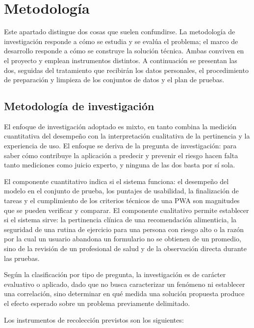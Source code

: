 \documentclass[conference]{IEEEtran}
\begin{document}
\section{Metodología}
Este apartado distingue dos cosas que suelen confundirse. La metodología de investigación responde a cómo se estudia y se evalúa el problema; el marco de desarrollo responde a cómo se construye la solución técnica. Ambas conviven en el proyecto y emplean instrumentos distintos. A continuación se presentan las dos, seguidas del tratamiento que recibirán los datos personales, el procedimiento de preparación y limpieza de los conjuntos de datos y el plan de pruebas.

\subsection{Metodología de investigación}
El enfoque de investigación adoptado es mixto, en tanto combina la medición cuantitativa del desempeño con la interpretación cualitativa de la pertinencia y la experiencia de uso. El enfoque se deriva de la pregunta de investigación: para saber cómo contribuye la aplicación a predecir y prevenir el riesgo hacen falta tanto mediciones como juicio experto, y ninguna de las dos basta por sí sola.

El componente cuantitativo indica si el sistema funciona: el desempeño del modelo en el conjunto de prueba, los puntajes de usabilidad, la finalización de tareas y el cumplimiento de los criterios técnicos de una PWA son magnitudes que se pueden verificar y comparar. El componente cualitativo permite establecer si el sistema sirve: la pertinencia clínica de una recomendación alimenticia, la seguridad de una rutina de ejercicio para una persona con riesgo alto o la razón por la cual un usuario abandona un formulario no se obtienen de un promedio, sino de la revisión de un profesional de salud y de la observación directa durante las pruebas.

Según la clasificación por tipo de pregunta, la investigación es de carácter evaluativo o aplicado, dado que no busca caracterizar un fenómeno ni establecer una correlación, sino determinar en qué medida una solución propuesta produce el efecto esperado sobre un problema previamente delimitado.

Los instrumentos de recolección previstos son los siguientes:
\end{document}
